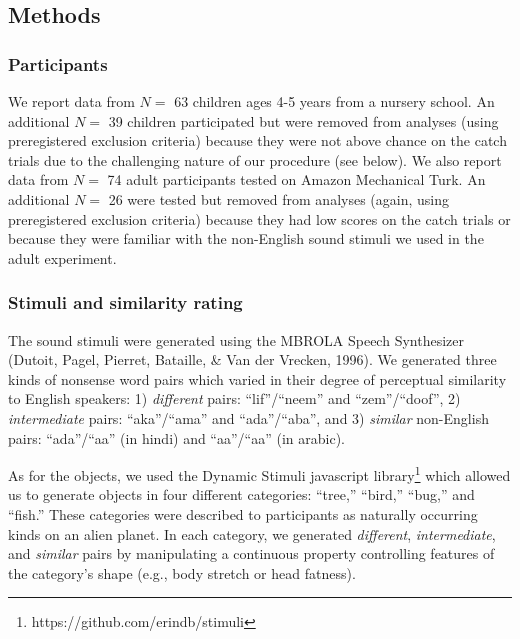 \documentclass[english,,man]{apa6}
\let\rmarkdownfootnote\footnote%
\def\footnote{\protect\rmarkdownfootnote}
\theoremstyle{definition}
\theoremstyle{definition}
\theoremstyle{definition}
\theoremstyle{remark}
\begin{document}
\subsection{Methods}\label{methods}

\subsubsection{Participants}\label{participants}

We report data from \(N=\) 63 children ages 4-5 years from a nursery
school. An additional \(N=\) 39 children participated but were removed
from analyses (using preregistered exclusion criteria) because they were
not above chance on the catch trials due to the challenging nature of
our procedure (see below). We also report data from \(N=\) 74 adult
participants tested on Amazon Mechanical Turk. An additional \(N=\) 26
were tested but removed from analyses (again, using preregistered
exclusion criteria) because they had low scores on the catch trials or
because they were familiar with the non-English sound stimuli we used in
the adult experiment.

\subsubsection{Stimuli and similarity
rating}\label{stimuli-and-similarity-rating}

The sound stimuli were generated using the MBROLA Speech Synthesizer
(Dutoit, Pagel, Pierret, Bataille, \& Van der Vrecken, 1996). We
generated three kinds of nonsense word pairs which varied in their
degree of perceptual similarity to English speakers: 1) \emph{different}
pairs: \enquote{lif}/\enquote{neem} and \enquote{zem}/\enquote{doof}, 2)
\emph{intermediate} pairs: \enquote{aka}/\enquote{ama} and
\enquote{ada}/\enquote{aba}, and 3) \emph{similar} non-English pairs:
\enquote{ada}/\enquote{aa} (in hindi) and
\enquote{aa}/\enquote{a\textipa{\textcrh}a} (in arabic).

As for the objects, we used the Dynamic Stimuli javascript
library\footnote{https://github.com/erindb/stimuli} which allowed us to
generate objects in four different categories: \enquote{tree,}
\enquote{bird,} \enquote{bug,} and \enquote{fish.} These categories were
described to participants as naturally occurring kinds on an alien
planet. In each category, we generated \emph{different},
\emph{intermediate}, and \emph{similar} pairs by manipulating a
continuous property controlling features of the category's shape (e.g.,
body stretch or head fatness).
\end{document}
